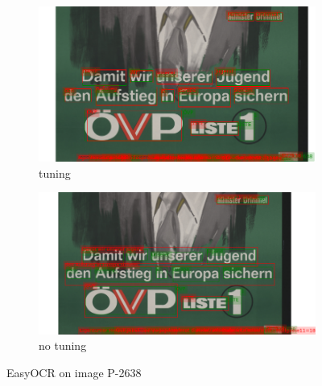 \begin{figure}[hbtp!]
    \begin{subfigure}{\textwidth}
        \centering
        \includegraphics[scale=0.36]{obrazky/plakaty/result_easyOCR_vienna1_split_tuning-91.png}
        \caption{tuning}
        \label{Im1:ex:easytun}
    \end{subfigure}

    \begin{subfigure}{\textwidth}
        \centering
        \includegraphics[scale=0.36]{obrazky/plakaty/result_easyOCR_vienna1_nosplit_notuning-91.png}
        \caption{no tuning}
        \label{Im1:ex:easy}
    \end{subfigure}
    \caption{EasyOCR on image P-2638}
    \label{Im1:ex:EasyOCR}
\end{figure}

